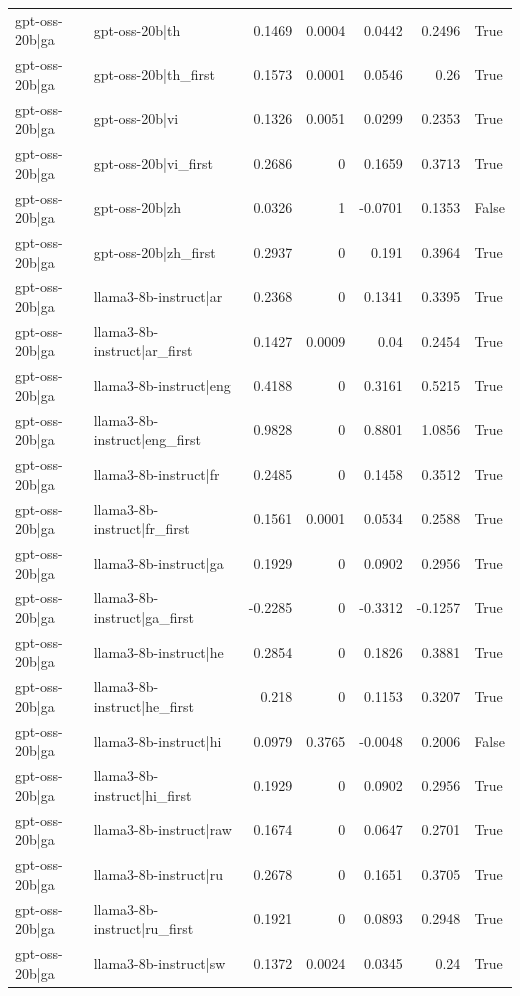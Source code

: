 \begin{table}
\begin{tabular}{l l r r r r l}
gpt-oss-20b|ga & gpt-oss-20b|th & 0.1469 & 0.0004 & 0.0442 & 0.2496 & True \\
gpt-oss-20b|ga & gpt-oss-20b|th_first & 0.1573 & 0.0001 & 0.0546 & 0.26 & True \\
gpt-oss-20b|ga & gpt-oss-20b|vi & 0.1326 & 0.0051 & 0.0299 & 0.2353 & True \\
gpt-oss-20b|ga & gpt-oss-20b|vi_first & 0.2686 & 0 & 0.1659 & 0.3713 & True \\
gpt-oss-20b|ga & gpt-oss-20b|zh & 0.0326 & 1 & -0.0701 & 0.1353 & False \\
gpt-oss-20b|ga & gpt-oss-20b|zh_first & 0.2937 & 0 & 0.191 & 0.3964 & True \\
gpt-oss-20b|ga & llama3-8b-instruct|ar & 0.2368 & 0 & 0.1341 & 0.3395 & True \\
gpt-oss-20b|ga & llama3-8b-instruct|ar_first & 0.1427 & 0.0009 & 0.04 & 0.2454 & True \\
gpt-oss-20b|ga & llama3-8b-instruct|eng & 0.4188 & 0 & 0.3161 & 0.5215 & True \\
gpt-oss-20b|ga & llama3-8b-instruct|eng_first & 0.9828 & 0 & 0.8801 & 1.0856 & True \\
gpt-oss-20b|ga & llama3-8b-instruct|fr & 0.2485 & 0 & 0.1458 & 0.3512 & True \\
gpt-oss-20b|ga & llama3-8b-instruct|fr_first & 0.1561 & 0.0001 & 0.0534 & 0.2588 & True \\
gpt-oss-20b|ga & llama3-8b-instruct|ga & 0.1929 & 0 & 0.0902 & 0.2956 & True \\
gpt-oss-20b|ga & llama3-8b-instruct|ga_first & -0.2285 & 0 & -0.3312 & -0.1257 & True \\
gpt-oss-20b|ga & llama3-8b-instruct|he & 0.2854 & 0 & 0.1826 & 0.3881 & True \\
gpt-oss-20b|ga & llama3-8b-instruct|he_first & 0.218 & 0 & 0.1153 & 0.3207 & True \\
gpt-oss-20b|ga & llama3-8b-instruct|hi & 0.0979 & 0.3765 & -0.0048 & 0.2006 & False \\
gpt-oss-20b|ga & llama3-8b-instruct|hi_first & 0.1929 & 0 & 0.0902 & 0.2956 & True \\
gpt-oss-20b|ga & llama3-8b-instruct|raw & 0.1674 & 0 & 0.0647 & 0.2701 & True \\
gpt-oss-20b|ga & llama3-8b-instruct|ru & 0.2678 & 0 & 0.1651 & 0.3705 & True \\
gpt-oss-20b|ga & llama3-8b-instruct|ru_first & 0.1921 & 0 & 0.0893 & 0.2948 & True \\
gpt-oss-20b|ga & llama3-8b-instruct|sw & 0.1372 & 0.0024 & 0.0345 & 0.24 & True \\

\end{tabular}
\end{table}
